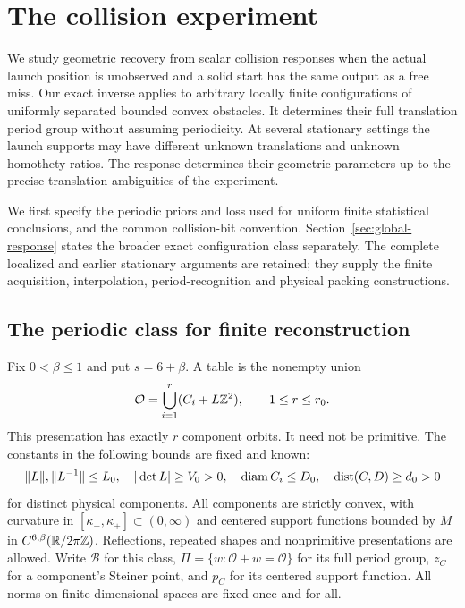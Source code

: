 \section{The collision experiment}
\label{sec:setting}
We study geometric recovery from scalar collision responses when the
actual launch position is unobserved and a solid start has the same
output as a free miss. Our exact inverse applies to arbitrary locally
finite configurations of uniformly separated bounded convex obstacles.
It determines their full translation period group without assuming
periodicity. At several stationary settings the launch supports may
have different unknown translations and unknown homothety ratios.
The response determines their geometric parameters up to the precise
translation ambiguities of the experiment.

We first specify the periodic priors and loss used for uniform finite
statistical conclusions, and the common collision-bit convention.
Section~\ref{sec:global-response} states the broader exact configuration
class separately. The complete localized and earlier stationary
arguments are retained; they supply the finite acquisition,
interpolation, period-recognition and physical packing constructions.

\subsection{The periodic class for finite reconstruction}
Fix $0<\beta\le1$ and put $s=6+\beta$. A table is the nonempty union
\begin{equation}\label{eq:presentation}
 \mathcal O=\bigcup_{i=1}^r(C_i+L\mathbb Z^2),\qquad 1\le r\le r_0.
\end{equation}
This presentation has exactly $r$ component orbits. It need not be
primitive. The constants in the following bounds are fixed and known:
\begin{equation}\label{eq:priors}
 \|L\|,\|L^{-1}\|\le L_0,\quad |\det L|\ge V_0>0,\quad
 \operatorname{diam} C_i\le D_0,\quad \operatorname{dist}(C,D)\ge d_0>0
\end{equation}
for distinct physical components. All components are strictly convex,
with curvature in $[\kappa_-,\kappa_+]\subset(0,\infty)$ and centered
support functions bounded by $M$ in $C^{6,\beta}(\mathbb R/2\pi\mathbb Z)$.
Reflections, repeated shapes and nonprimitive presentations are allowed.
Write $\mathcal B$ for this class, $\Pi=\{w:\mathcal O+w=\mathcal O\}$
for its full period group, $z_C$ for a component's Steiner point, and
$p_C$ for its centered support function. All norms on finite-dimensional
spaces are fixed once and for all.

